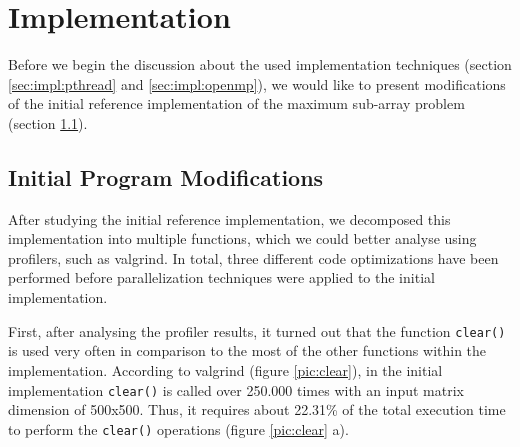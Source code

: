 \documentclass[conference]{IEEEtran}
\begin{document}
\section{Implementation}
\label{sec:impl}

Before we begin the discussion about the used implementation techniques (section \ref{sec:impl:pthread} and \ref{sec:impl:openmp}), we would like to present modifications of the initial reference implementation of the maximum sub-array problem (section \ref{sec:impl:modifications}). 

\subsection{Initial Program Modifications}
\label{sec:impl:modifications}

After studying the initial reference implementation, we decomposed this implementation into multiple functions, which we could better analyse using profilers, such as valgrind\cite{VALGRIND}. In total, three different code optimizations have been performed before parallelization techniques were applied to the initial implementation.  

First, after analysing the profiler results, it turned out that the function \texttt{clear()} is used very often in comparison to the most of the other functions within the implementation. According to valgrind (figure \ref{pic:clear}), in the initial implementation \texttt{clear()} is called over 250.000 times with an input matrix dimension of 500x500. Thus, it requires about 22.31\% of the total execution time to perform the \texttt{clear()} operations (figure \ref{pic:clear} a).  
\end{document}
